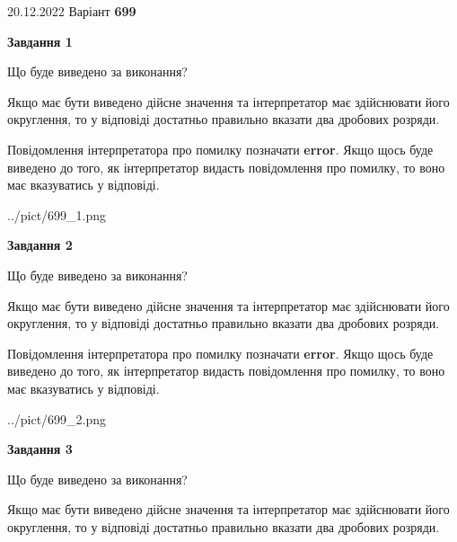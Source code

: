 \documentclass[12pt, ukrainian]{article}
\begin{document}
{20.12.2022 Варіант \No \textbf { 699 }\par}
{
\begin {Large}

{\begin {center}\textbf{Завдання 1}\end {center}}\par
Що буде виведено за виконання? \par

Якщо має бути виведено дійсне значення та інтерпретатор має здійснювати його округлення, 
то у відповіді достатньо правильно вказати два дробових розряди.

Повідомлення інтерпретатора про помилку позначати \textbf{error}.
Якщо щось буде виведено до того, як інтерпретатор видасть повідомлення про помилку, 
то воно має вказуватись у відповіді. \par

\begin{center}
	{../pict/699_1.png}
\end{center}
\newpage

{\begin {center}\textbf{Завдання 2}\end {center}}\par
Що буде виведено за виконання? \par

Якщо має бути виведено дійсне значення та інтерпретатор має здійснювати його округлення, 
то у відповіді достатньо правильно вказати два дробових розряди.

Повідомлення інтерпретатора про помилку позначати \textbf{error}.
Якщо щось буде виведено до того, як інтерпретатор видасть повідомлення про помилку, 
то воно має вказуватись у відповіді. \par

\begin{center}
	{../pict/699_2.png}
\end{center}
\newpage

{\begin {center}\textbf{Завдання 3}\end {center}}\par
Що буде виведено за виконання? \par

Якщо має бути виведено дійсне значення та інтерпретатор має здійснювати його округлення, 
то у відповіді достатньо правильно вказати два дробових розряди.


\end{Large}}
\end{document}

